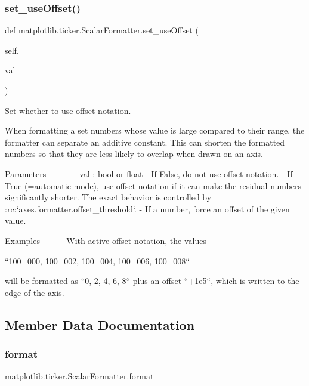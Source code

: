 \subsubsection{\texorpdfstring{set\+\_\+use\+Offset()}{set\_useOffset()}}
{\footnotesize\ttfamily def matplotlib.\+ticker.\+Scalar\+Formatter.\+set\+\_\+use\+Offset (\begin{DoxyParamCaption}\item[{}]{self,  }\item[{}]{val }\end{DoxyParamCaption})}

\begin{DoxyVerb}Set whether to use offset notation.

When formatting a set numbers whose value is large compared to their
range, the formatter can separate an additive constant. This can
shorten the formatted numbers so that they are less likely to overlap
when drawn on an axis.

Parameters
----------
val : bool or float
    - If False, do not use offset notation.
    - If True (=automatic mode), use offset notation if it can make
      the residual numbers significantly shorter. The exact behavior
      is controlled by :rc:`axes.formatter.offset_threshold`.
    - If a number, force an offset of the given value.

Examples
--------
With active offset notation, the values

``100_000, 100_002, 100_004, 100_006, 100_008``

will be formatted as ``0, 2, 4, 6, 8`` plus an offset ``+1e5``, which
is written to the edge of the axis.
\end{DoxyVerb}
 

\subsection{Member Data Documentation}
\mbox{\label{classmatplotlib_1_1ticker_1_1ScalarFormatter_a33d1953e906b39fb5cfaa2e16c5c0056}} 
\subsubsection{\texorpdfstring{format}{format}}
{\footnotesize\ttfamily matplotlib.\+ticker.\+Scalar\+Formatter.\+format}

